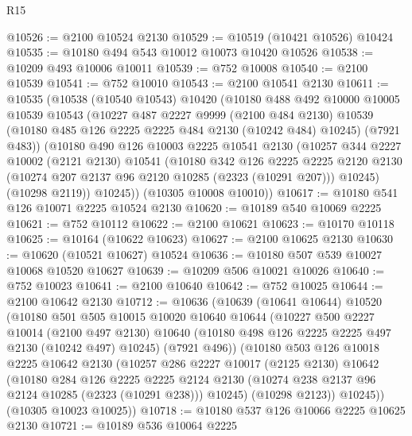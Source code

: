 \begin{lexlean}{R15}
\begin{coremodule}
@10526 := @2100 @10524 @2130
@10529 := @10519 (@10421 @10526) @10424
@10535 := @10180 @494 @543 @10012 @10073 @10420 @10526
@10538 := @10209 @493 @10006 @10011
@10539 := @752 @10008
@10540 := @2100 @10539
@10541 := @752 @10010
@10543 := @2100 @10541 @2130
@10611 := @10535
    (@10538
      (@10540 @10543)
      @10420
      (@10180
        @488
        @492
        @10000
        @10005
        @10539
        @10543
        (@10227
          @487
          @2227
          @9999
          (@2100 @484 @2130)
          @10539
          (@10180 @485 @126 @2225 @2225 @484 @2130 (@10242 @484) @10245)
          (@7921 @483))
        (@10180
          @490
          @126
          @10003
          @2225
          @10541
          @2130
          (@10257
            @344
            @2227
            @10002
            (@2121 @2130)
            @10541
            (@10180
              @342
              @126
              @2225
              @2225
              @2120
              @2130
              (@10274 @207 @2137 @96 @2120 @10285 (@2323 (@10291 @207)))
              @10245)
            (@10298 @2119))
          @10245))
      (@10305 @10008 @10010))
@10617 := @10180 @541 @126 @10071 @2225 @10524 @2130
@10620 := @10189 @540 @10069 @2225
@10621 := @752 @10112
@10622 := @2100 @10621
@10623 := @10170 @10118
@10625 := @10164 (@10622 @10623)
@10627 := @2100 @10625 @2130
@10630 := @10620 (@10521 @10627) @10524
@10636 := @10180 @507 @539 @10027 @10068 @10520 @10627
@10639 := @10209 @506 @10021 @10026
@10640 := @752 @10023
@10641 := @2100 @10640
@10642 := @752 @10025
@10644 := @2100 @10642 @2130
@10712 := @10636
    (@10639
      (@10641 @10644)
      @10520
      (@10180
        @501
        @505
        @10015
        @10020
        @10640
        @10644
        (@10227
          @500
          @2227
          @10014
          (@2100 @497 @2130)
          @10640
          (@10180 @498 @126 @2225 @2225 @497 @2130 (@10242 @497) @10245)
          (@7921 @496))
        (@10180
          @503
          @126
          @10018
          @2225
          @10642
          @2130
          (@10257
            @286
            @2227
            @10017
            (@2125 @2130)
            @10642
            (@10180
              @284
              @126
              @2225
              @2225
              @2124
              @2130
              (@10274 @238 @2137 @96 @2124 @10285 (@2323 (@10291 @238)))
              @10245)
            (@10298 @2123))
          @10245))
      (@10305 @10023 @10025))
@10718 := @10180 @537 @126 @10066 @2225 @10625 @2130
@10721 := @10189 @536 @10064 @2225

\end{coremodule}
\end{lexlean}
